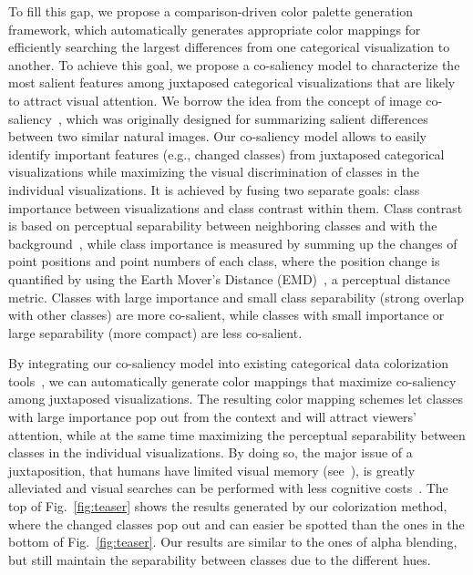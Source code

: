 To fill this gap, we propose a comparison-driven color palette generation framework, which automatically generates appropriate color mappings for efficiently searching the largest differences from one categorical visualization to another.
To achieve this goal, we propose a co-saliency model to characterize the most salient features among juxtaposed categorical visualizations that are likely to attract visual attention. We borrow the idea from the concept of image co-saliency~\cite{Jacobs10}, which was originally designed for summarizing salient differences between two similar natural images.
Our co-saliency model allows to easily identify important features (e.g., changed classes) from juxtaposed categorical visualizations while maximizing the visual discrimination of classes in the individual visualizations. It is achieved by fusing two separate goals: class importance between visualizations and class contrast within them. Class contrast is based on perceptual separability between
neighboring classes and with the background~\cite{Wang2018}, while
class importance %
is measured by summing up the changes of point positions and point numbers  of each class, where the position change is quantified by using the Earth Mover's Distance (EMD)~\cite{rubner2000earth}, a perceptual distance metric.
Classes with large importance and small class separability (strong overlap with other classes) are more co-salient, while classes with small importance or large separability (more compact) are less co-salient.

By integrating our co-saliency model into existing categorical data colorization tools~\cite{Lu21}, we can automatically generate color mappings that maximize co-saliency among juxtaposed visualizations. The resulting color mapping schemes let classes with large importance pop out from the context and will attract viewers' attention,  while at the same time maximizing the perceptual separability between classes in the individual visualizations. By doing so,
the major issue of a juxtaposition, that humans have limited visual memory (see~\cite{Tominski12}), is greatly alleviated and visual searches can be performed with less cognitive costs~\cite{healey1995visualizing}.
%
The top of Fig.~\ref{fig:teaser} shows the results generated by our colorization method, where the changed classes pop out and can easier be spotted than the ones in the bottom of Fig.~\ref{fig:teaser}. Our results are similar to the ones of alpha blending, but still maintain the separability between classes due to the different hues.

